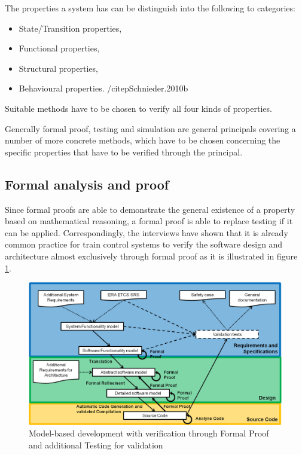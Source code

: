 \documentclass{./template/openetcs_report}
\begin{document}
The properties a system has can be distinguish into the following to categories:

\vspace{-10pt}
\begin{itemize}[topsep=2pt, partopsep=2pt,itemsep=2pt,parsep=2pt]
\item State/Transition properties,
\item Functional properties,
\item Structural properties,
\item Behavioural properties. /citep{Schnieder.2010b}
\end{itemize}

Suitable methods have to be chosen to verify all four kinds of properties. 

Generally formal proof, testing and simulation are general principals covering a number of more concrete methods, which have to be chosen concerning the specific properties that have to be verified through the principal.

\subsection{ Formal analysis and proof}

Since formal proofs are able to demonstrate the general existence of a property based on mathematical reasoning, a formal proof is able to replace testing if it can be applied. Correspondingly, the interviews have shown that it is already common practice for train control systems to verify the software design and architecture almost exclusively through formal proof as it is illustrated in figure \ref{fig: MBD-Formal-Proof}.

\begin{figure}[ht]
\centering
\includegraphics[scale=0.6]{Lifecycle-Model-based-Approach-Formal-Proof.png}
\caption{Model-based development with verification through Formal Proof and additional Testing for validation}
\label{fig: MBD-Formal-Proof}
\end{figure}
\end{document}
